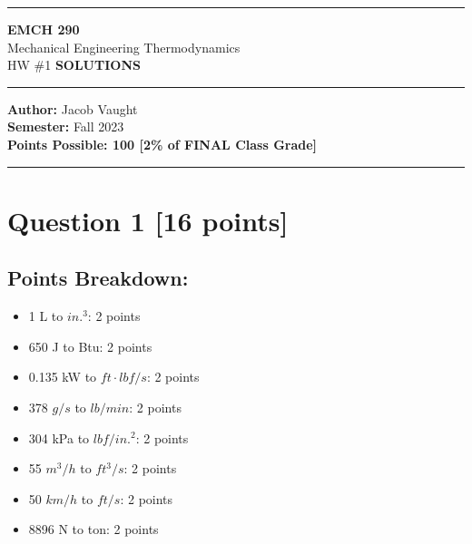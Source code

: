 \documentclass[12pt]{article}
\begin{document}
\hrule
\vspace{0.2cm}

\begin{center}
    \LARGE \textbf{EMCH 290} \\
    \Large Mechanical Engineering Thermodynamics \\
    \large HW \#1 \textbf{SOLUTIONS}
\end{center}

\hrule
\vspace{0.2cm}

\begin{center}
    \textbf{Author:} Jacob Vaught \\
    \vspace{0.2cm}
    \textbf{Semester:} Fall 2023 \\
    \vspace{0.2cm}
    \textbf{Points Possible: 100 [2\% of FINAL Class Grade]}
\end{center}

\hrule
\vspace{0.5cm}

\newpage
\section*{Question 1 [16 points]}
\subsection*{Points Breakdown:}
\begin{itemize}
    \item 1 L to \(in.^3\): 2 points
    \item 650 J to Btu: 2 points
    \item 0.135 kW to \(ft \cdot lbf/s\): 2 points
    \item 378 \(g/s\) to \(lb/min\): 2 points
    \item 304 kPa to \(lbf/in.^2\): 2 points
    \item 55 \(m^3/h\) to \(ft^3/s\): 2 points
    \item 50 \(km/h\) to \(ft/s\): 2 points
    \item 8896 N to ton: 2 points
\end{itemize}
\end{document}
